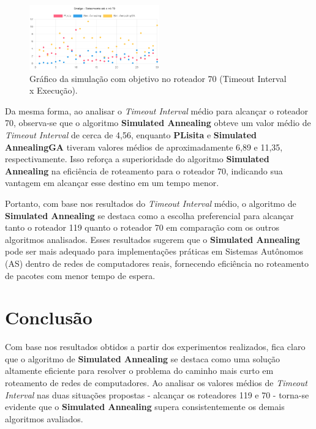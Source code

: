\documentclass[conference]{IEEEtran}
\begin{document}
\begin{figure}[h]
    \centering
    \includegraphics[width=0.5\textwidth]{chart_timeout_interval_70}
    \caption{Gráfico da simulação com objetivo no roteador 70 (Timeout Interval x Execução).}
    \label{fig:exemplo}
\end{figure}

Da mesma forma, ao analisar o \textit{Timeout Interval} médio para alcançar o roteador 70, observa-se que o algoritmo \textbf{Simulated Annealing} obteve um valor médio de \textit{Timeout Interval} de cerca de 4,56, enquanto \textbf{PLisita} e \textbf{Simulated AnnealingGA} tiveram valores médios de aproximadamente 6,89 e 11,35, respectivamente. Isso reforça a superioridade do algoritmo \textbf{Simulated Annealing} na eficiência de roteamento para o roteador 70, indicando sua vantagem em alcançar esse destino em um tempo menor.

Portanto, com base nos resultados do \textit{Timeout Interval} médio, o algoritmo de \textbf{Simulated Annealing} se destaca como a escolha preferencial para alcançar tanto o roteador 119 quanto o roteador 70 em comparação com os outros algoritmos analisados. Esses resultados sugerem que o \textbf{Simulated Annealing} pode ser mais adequado para implementações práticas em Sistemas Autônomos (AS) dentro de redes de computadores reais, fornecendo eficiência no roteamento de pacotes com menor tempo de espera.

\section{Conclusão}

Com base nos resultados obtidos a partir dos experimentos realizados, fica claro que o algoritmo de \textbf{Simulated Annealing} se destaca como uma solução altamente eficiente para resolver o problema do caminho mais curto em roteamento de redes de computadores. Ao analisar os valores médios de \textit{Timeout Interval} nas duas situações propostas - alcançar os roteadores 119 e 70 - torna-se evidente que o \textbf{Simulated Annealing} supera consistentemente os demais algoritmos avaliados.
\end{document}
